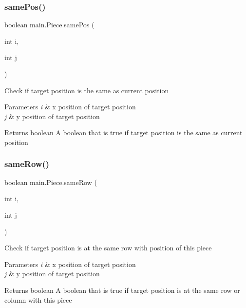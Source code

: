 \subsubsection{\texorpdfstring{samePos()}{samePos()}}
{\footnotesize\ttfamily boolean main.\+Piece.\+same\+Pos (\begin{DoxyParamCaption}\item[{int}]{i,  }\item[{int}]{j }\end{DoxyParamCaption})\hspace{0.3cm}{\ttfamily [inline]}}

Check if target position is the same as current position


\begin{DoxyParams}{Parameters}
{\em i} & x position of target position \\
\hline
{\em j} & y position of target position \\
\hline
\end{DoxyParams}
\begin{DoxyReturn}{Returns}
boolean A boolean that is true if target position is the same as current position 
\end{DoxyReturn}
\mbox{\label{classmain_1_1_piece_a59913ef35b6873e7b7e49f54cbd3f825}} 
\subsubsection{\texorpdfstring{sameRow()}{sameRow()}}
{\footnotesize\ttfamily boolean main.\+Piece.\+same\+Row (\begin{DoxyParamCaption}\item[{int}]{i,  }\item[{int}]{j }\end{DoxyParamCaption})\hspace{0.3cm}{\ttfamily [inline]}}

Check if target position is at the same row with position of this piece 
\begin{DoxyParams}{Parameters}
{\em i} & x position of target position \\
\hline
{\em j} & y position of target position \\
\hline
\end{DoxyParams}
\begin{DoxyReturn}{Returns}
boolean A boolean that is true if target position is at the same row or column with this piece 
\end{DoxyReturn}
\mbox{\label{classmain_1_1_piece_adb879d4da6b0570163f9581a038ad3a0}} 
